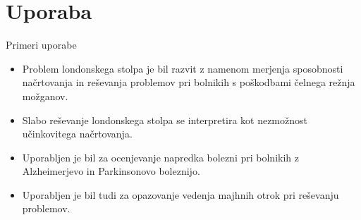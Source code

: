 \documentclass{beamer}
\begin{document}
\section{Uporaba}
\begin{frame}{Primeri uporabe}
    \begin{itemize}
        \item Problem londonskega stolpa je bil razvit z namenom merjenja sposobnosti načrtovanja in reševanja problemov pri bolnikih s poškodbami čelnega režnja možganov.
        \item Slabo reševanje londonskega stolpa se interpretira kot nezmožnost učinkovitega načrtovanja.
        \item Uporabljen je bil za ocenjevanje napredka bolezni pri bolnikih z Alzheimerjevo in Parkinsonovo boleznijo.
        \item Uporabljen je bil tudi za opazovanje vedenja majhnih otrok pri reševanju problemov.
    \end{itemize}
\end{frame}
\end{document}
